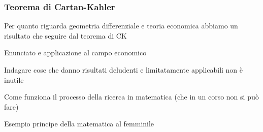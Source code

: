 \documentclass{beamer}
\begin{document}
\begin{frame}
\frametitle{Teorema di Cartan-Kahler}
Per quanto riguarda geometria differenziale e teoria economica abbiamo un risultato che seguire dal teorema di CK

Enunciato e applicazione al campo economico
\end{frame}

\begin{frame}
Indagare cose che danno risultati deludenti e limitatamente applicabili non è inutile

Come funziona il processo della ricerca in matematica (che in un corso non si può fare)

Esempio principe della matematica al femminile
\end{frame}
\end{document}
